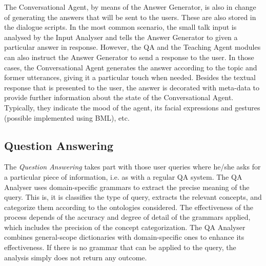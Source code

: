 The Conversational Agent, by means of the Answer Generator, is also in change of generating the answers that will be sent to the users. These are also stored in the dialogue scripts. 
In the most common scenario, the small talk input is analysed by the Input Analyser and tells the Answer Generator to given a particular answer in response.
However, the \ac{QA} and the Teaching Agent modules can also instruct the Answer Generator to send a response to the user.
In those cases, the Conversational Agent generates the answer according to the topic and former utterances, giving it a particular touch when needed.
Besides the textual response that is presented to the user, the answer is decorated with meta-data to provide further information about the state of the Conversational Agent. Typically, they indicate the mood of the agent, its facial expressions and gestures (possible implemented using \ac{BML}), etc.


\subsection{Question Answering}

The {\em Question Answering} takes part with those user queries where he/she asks for a particular piece of information, i.e. as with a regular \ac{QA} system. 
The QA Analyser uses domain-specific grammars to extract the precise meaning of the query.
This is, it is classifies the type of query, extracts the relevant concepts, and categorize them according to the ontologies considered. The effectiveness of the process depends of the accuracy and degree of detail of the grammars applied, which includes the precision of the concept categorization. The QA Analyser combines general-scope dictionaries with domain-specific ones to enhance its effectiveness. If there is no grammar that can be applied to the query, the analysis simply does not return any outcome.

